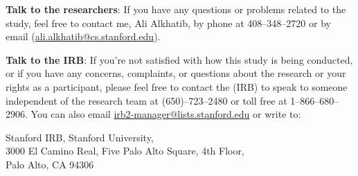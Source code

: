 \documentclass[10pt]{article}
\newcommand{\contact}[1]{{\color{red}#1}}
\begin{document}
\textbf{Talk to the researchers}:
If you have any questions or problems related to the study,
feel free to contact me, \contact{Ali Alkhatib},
by phone at \contact{408--348--2720} or
by email (\contact{\url{ali.alkhatib@cs.stanford.edu}}).

\textbf{Talk to the IRB}:
If you're not satisfied with how this study is being conducted, or
if you have any concerns, complaints, or
questions about the research or
your rights as a participant, please feel free to contact the
(IRB) to speak to someone independent of the research team at
\contact{(650)--723--2480} or
toll free at \contact{1--866--680--2906}.
You can also email \url{irb2-manager@lists.stanford.edu} or
write to:

\begin{center}\contact{Stanford IRB, Stanford University,\\
         3000 El Camino Real, Five Palo Alto Square, 4th Floor,\\
         Palo Alto, CA 94306}\end{center}
\end{document}

